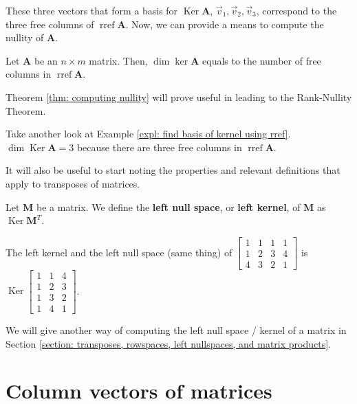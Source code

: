 \documentclass[]{book}
\DeclareMathOperator{\rref}{rref}
\DeclareMathOperator{\spacedim}{dim}
\DeclareMathOperator{\kernel}{Ker}
\newcommand{\mat}[1]{\ensuremath{\mathbf{#1}}}
\begin{document}
These three vectors that form a basis for $\kernel\mat{A}$, $\vec{v}_1,\vec{v}_2,\vec{v}_3$, correspond to the three free columns of $\rref\mat{A}$. Now, we can provide a means to compute the nullity of $\mat{A}$.

\begin{theorem}
    \label{thm: computing nullity}
    Let \mat{A} be an $n \times m$ matrix. Then, $\spacedim\ker\mat{A}$ equals to the number of free columns in $\rref\mat{A}$.
\end{theorem}

Theorem \ref{thm: computing nullity} will prove useful in leading to the Rank-Nullity Theorem.
\begin{example}
    Take another look at Example \ref{expl: find basis of kernel using rref}. $\spacedim\kernel\mat{A} = 3$ because there are three free columns in $\rref\mat{A}$.
\end{example}

It will also be useful to start noting the properties and relevant definitions that apply to transposes of matrices. 

\begin{definition}
    \label{defn: left null space; left kernel}
    Let $\mat{M}$ be a matrix. We define the \textbf{left null space}, or \textbf{left kernel}, of $\mat{M}$ as $\kernel\mat{M}^T$.
\end{definition}

\begin{example}
    The left kernel and the left null space (same thing) of $\begin{bmatrix}1&1&1&1\\1&2&3&4\\4&3&2&1\end{bmatrix}$ is $\kernel\begin{bmatrix}1&1&4\\1&2&3\\1&3&2\\1&4&1\end{bmatrix}$.
\end{example}

We will give another way of computing the left null space / kernel of a matrix in Section \ref{section: transposes, rowspaces, left nullspaces, and matrix products}.
\section{Column vectors of matrices}
\end{document}
